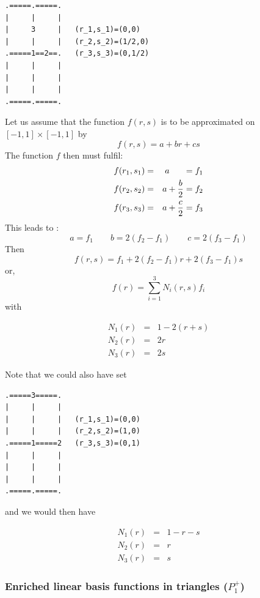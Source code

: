 \begin{verbatim}
.=====.=====.
|     |     |
|     3     |   (r_1,s_1)=(0,0)
|     |     |   (r_2,s_2)=(1/2,0)
.=====1==2==.   (r_3,s_3)=(0,1/2)
|     |     |
|     |     |
|     |     |
.=====.=====.
\end{verbatim}

Let us assume that the function $f(r,s)$ is to be approximated on $[-1,1]\times[-1,1]$ by 
\[
f(r,s)=a+br+cs
\]
The function $f$ then must fulfil:
\begin{eqnarray}
f(r_1,s_1)&=&a \;\;\;\;\;\; =f_1    \nonumber\\
f(r_2,s_2)&=&a+\frac{b}{2}=f_2 \nonumber\\
f(r_3,s_3)&=&a+\frac{c}{2}=f_3
\end{eqnarray}
This leads to : 
\[
a=f_1
\quad
\quad
b=2(f_2-f_1)
\quad
\quad
c=2(f_3-f_1)
\]
Then
\[
f(r,s)=f_1 + 2(f_2-f_1) r + 2(f_3-f_1) s
\]
or, 
\[
f(r) = \sum_{i=1}^3 N_i(r,s) f_i
\]
with
\begin{mdframed}[backgroundcolor=blue!5]
\begin{eqnarray}
N_1(r) &=& 1-2(r+s)  \nonumber\\
N_2(r) &=& 2r   \nonumber\\
N_3(r) &=& 2s
\end{eqnarray}
\end{mdframed}

Note that we could also have set 
\begin{verbatim}
.=====3=====.
|     |     |
|     |     |   (r_1,s_1)=(0,0)
|     |     |   (r_2,s_2)=(1,0)
.=====1=====2   (r_3,s_3)=(0,1)
|     |     |
|     |     |
|     |     |
.=====.=====.
\end{verbatim}
and we would then have
\begin{mdframed}[backgroundcolor=blue!5]
\begin{eqnarray}
N_1(r) &=& 1-r-s  \nonumber\\
N_2(r) &=& r   \nonumber\\
N_3(r) &=& s
\end{eqnarray}
\end{mdframed}





\subsubsection{Enriched linear basis functions in triangles ($P_1^+$)}

